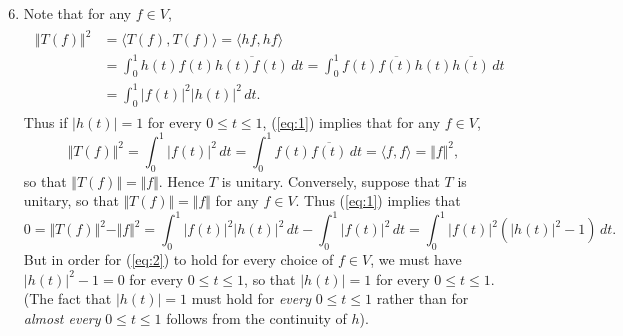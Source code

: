 \documentclass[12pt]{article}
\begin{document}
\begin{enumerate}
\setcounter{enumi}{5}
\item
Note that for any $f \in V$,
\begin{align} \label{eq:1}
\begin{split}
\Vert T(f) \Vert^2 &= \langle T(f), T(f) \rangle = \langle hf, hf \rangle \\
&= \int_0^1 h(t)f(t) \overline{h(t)f(t)} \, dt = \int_0^1 f(t) \overline{f(t)} h(t) \overline{h(t)} \, dt \\
&= \int_0^1 |f(t)|^2 |h(t)|^2 \, dt.
\end{split}
\end{align}
Thus if $|h(t)| = 1$ for every $0 \leq t \leq 1$, (\ref{eq:1}) implies that for any $f \in V$,
\begin{equation*}
\Vert T(f) \Vert^2 = \int_0^1 |f(t)|^2 \, dt = \int_0^1 f(t) \overline{f(t)} \, dt = \langle f, f \rangle = \Vert f \Vert^2,
\end{equation*}
so that $\Vert T(f) \Vert = \Vert f \Vert$. Hence $T$ is unitary. Conversely, suppose that $T$ is unitary, so that $\Vert T(f) \Vert = \Vert f \Vert$ for any $f \in V$. Thus (\ref{eq:1}) implies that
\begin{equation} \label{eq:2}
0 = \Vert T(f) \Vert^2 - \Vert f \Vert^2 = \int_0^1 |f(t)|^2 |h(t)|^2 \, dt - \int_0^1 |f(t)|^2 \, dt = \int_0^1 |f(t)|^2 (|h(t)|^2 - 1) \, dt.
\end{equation}
But in order for (\ref{eq:2}) to hold for every choice of $f \in V$, we must have $|h(t)|^2 - 1 = 0$ for every $0 \leq t \leq 1$, so that $|h(t)| = 1$ for every $0 \leq t \leq 1$. (The fact that $|h(t)| = 1$ must hold for \emph{every} $0 \leq t \leq 1$ rather than for \emph{almost every} $0 \leq t \leq 1$ follows from the continuity of $h$).


\end{enumerate}
\end{document}
